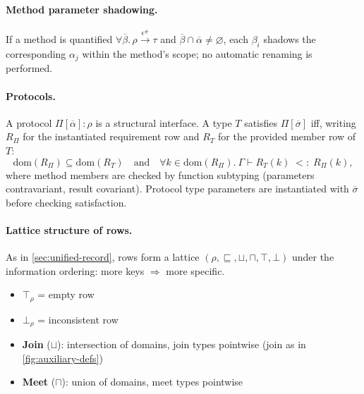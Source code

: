 \paragraph{Method parameter shadowing.}
If a method is quantified $\forall\overline{\beta}.\,\rho \xrightarrow{\epsilon^\#} \tau$ and $\overline{\beta} \cap \overline{\alpha} \neq \varnothing$, each $\beta_i$ shadows the corresponding $\alpha_j$ within the method’s scope; no automatic renaming is performed.

\paragraph{Protocols.}
A protocol $\Pi[\overline{\alpha}]: \rho$ is a structural interface.
A type $T$ satisfies $\Pi[\overline{\sigma}]$ iff, writing $R_\Pi$ for the instantiated requirement row and $R_T$ for the provided member row of $T$:
\[
\mathrm{dom}(R_\Pi) \subseteq \mathrm{dom}(R_T)
\quad\text{and}\quad
\forall k \in \mathrm{dom}(R_\Pi).\ \Gamma \vdash R_T(k) \;<:\; R_\Pi(k),
\]
where method members are checked by function subtyping (parameters contravariant, result covariant). Protocol type parameters are instantiated with $\overline{\sigma}$ before checking satisfaction.

\paragraph{Lattice structure of rows.}
As in \cref{sec:unified-record}, rows form a lattice $(\mathcal{\rho}, \sqsubseteq, \sqcup, \sqcap, \top, \bot)$ under the information ordering: more keys $\Rightarrow$ more specific.
\begin{itemize}
  \item $\top_\rho$ = empty row
  \item $\bot_\rho$ = inconsistent row
  \item \textbf{Join} ($\sqcup$): intersection of domains, join types pointwise (join as in \cref{fig:auxiliary-defs})
  \item \textbf{Meet} ($\sqcap$): union of domains, meet types pointwise
\end{itemize}

